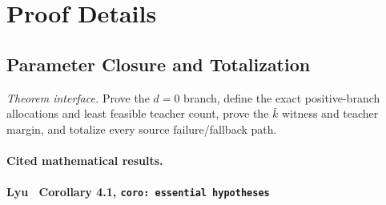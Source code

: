 \appendix

\section{Proof Details}

\subsection{Parameter Closure and Totalization}\label{app:step_001}

\noindent\textit{Theorem interface.} Prove the \(d=0\) branch, define the exact positive-branch   allocations and least feasible teacher count, prove the \(\bar k\) witness   and teacher margin, and totalize every source failure/fallback path.

\paragraph{Cited mathematical results.}



\paragraph{Lyu~\citep{lyu2025} Corollary 4.1, \texttt{coro: essential hypotheses}}

